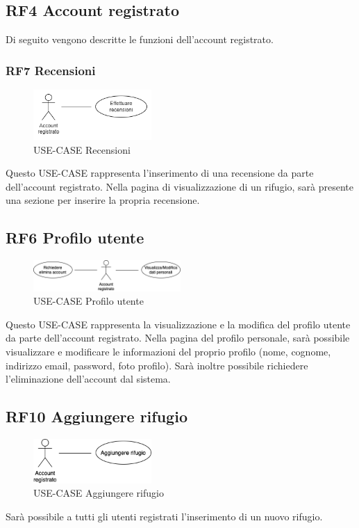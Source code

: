 \documentclass[a4paper,12pt]{article}
\begin{document}
\subsection*{RF4 Account registrato}

Di seguito vengono descritte le funzioni dell'account registrato.

\subsubsection*{RF7 Recensioni}
\begin{figure}[H]
   \centering
   \includegraphics[width=0.4\textwidth]{img/recensioni_registrato.png}
    \caption{USE-CASE Recensioni}
\end{figure}

Questo USE-CASE rappresenta l'inserimento di una recensione da parte dell'account registrato.
Nella pagina di visualizzazione di un rifugio, sarà presente una sezione per inserire la propria recensione.
 
\subsection*{RF6 Profilo utente}
\begin{figure}[H]
   \centering   \includegraphics[width=0.5\textwidth]{img/profilo_utente.png}
    \caption{USE-CASE Profilo utente}
\end{figure}

Questo USE-CASE rappresenta la visualizzazione e la modifica del profilo utente da parte dell'account registrato.
Nella pagina del profilo personale, sarà possibile visualizzare e modificare le informazioni del proprio profilo (nome, cognome, indirizzo email, password, foto profilo).
Sarà inoltre possibile richiedere l'eliminazione dell'account dal sistema. 


\subsection*{RF10 Aggiungere rifugio}
\begin{figure}[H]
   \centering   \includegraphics[width=0.4\textwidth]{img/aggiungere_rifugio.png}
    \caption{USE-CASE Aggiungere rifugio}
\end{figure}
Sarà possibile a tutti gli utenti registrati l'inserimento di un nuovo rifugio.
\end{document}
